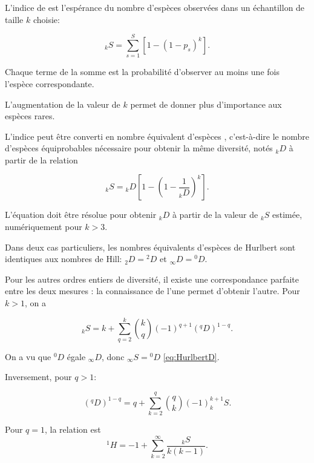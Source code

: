 \documentclass[
  11pt,
  french,
  a4paper,
  extrafontsizes,onecolumn,openright
  ]{memoir}
\begin{document}
L'indice de \textcite{Hurlbert1971} est l'espérance du nombre d'espèces observées dans un échantillon de taille \(k\) choisie:

\begin{equation}
  \label{eq:HurlbertSk}
  _{k}S = \sum^S_{s=1}{\left[1-{\left(1-p_s\right)}^k\right]}.
\end{equation}

Chaque terme de la somme est la probabilité d'observer au moins une fois l'espèce correspondante.

L'augmentation de la valeur de \(k\) permet de donner plus d'importance aux espèces rares.

L'indice peut être converti en nombre équivalent d'espèces \autocite{Dauby2012}, c'est-à-dire le nombre d'espèces équiprobables nécessaire pour obtenir la même diversité, notés \(_{k}D\) à partir de la relation

\begin{equation}
  \label{eq:HurlbertD}
  _{k}S = {_{k}D} \left[1-{\left(1-\frac{1}{_{k}D}\right)}^k\right].
\end{equation}

L'équation doit être résolue pour obtenir \(_{k}D\) à partir de la valeur de \(_{k}S\) estimée, numériquement pour \(k>3\).

Dans deux cas particuliers, les nombres équivalents d'espèces de Hurlbert sont identiques aux nombres de Hill: \(_{2}D ={^{2}\!D}\) et \(_{\infty}D={^{0}\!D}\).

Pour les autres ordres entiers de diversité, il existe une correspondance parfaite entre les deux mesures \autocite[Annexe S2]{Chao2014}: la connaissance de l'une permet d'obtenir l'autre. Pour \(k>1\), on a \autocite{Leinster2012}

\begin{equation}
  \label{eq:HurlbertDq}
  _{k}S = k + \sum_{q=2}^{k}{\binom{k}{q} (-1)^{q+1} (^{q}\!D)^{1-q}}.
\end{equation}

On a vu que \(^{0}\!D\) égale \(_{\infty}D\), donc \(_{\infty}S={^{0}\!D}\) \eqref{eq:HurlbertD}.

Inversement, pour \(q>1\):

\begin{equation}
  \label{eq:DqHurlbert}
  (^{q}\!D)^{1-q} = q + \sum_{k=2}^{q}{\binom{q}{k} (-1)^{k+1} _{k}S}.
\end{equation}

Pour \(q=1\), la relation est \autocite{Mao2007}
\begin{equation}
  \label{eq:Mao2007}
  ^{1}\!H = -1 + \sum_{k=2}^{\infty}{\frac{_{k}S}{k(k-1)}}.
\end{equation}
\end{document}
